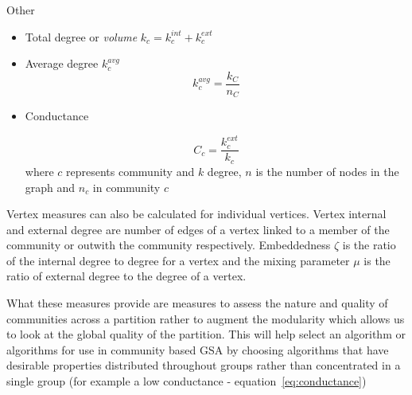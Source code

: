  Other 
    \begin{itemize}

    \item Total degree or \textit{volume} $k_c= k_c^{int}+k_c^{ext}$
    \item Average degree $k_c^{avg}$
    \begin{equation}
        k_c^{avg}=\frac{k_C}{n_C}
    \end{equation}
    \item Conductance
    
    \begin{equation}
    C_c = \frac{k_c^{ext}}{k_c}
    \label{eq:conductance}
    \end{equation}
    where $c$ represents community and $k$ degree, $n$ is the number of nodes in the graph and $n_c$ in community $c$
\end{itemize}




Vertex measures can also be calculated for individual vertices. Vertex internal and external degree are number of edges of a vertex linked to a member of the community or outwith the community respectively. Embeddedness $\zeta$ is the ratio of the internal degree to degree for a vertex and the mixing parameter $\mu$ is the ratio of external degree to the degree of a vertex\cite{fortunato2016community}.

What these measures provide are measures to assess the nature and quality of communities across a partition rather to augment the modularity which allows us to look at the global quality of the partition. This will help select an algorithm or algorithms for use in community based GSA by choosing algorithms that have desirable properties distributed throughout groups rather than concentrated in a single group (for example a low conductance - equation~\ref{eq:conductance})
